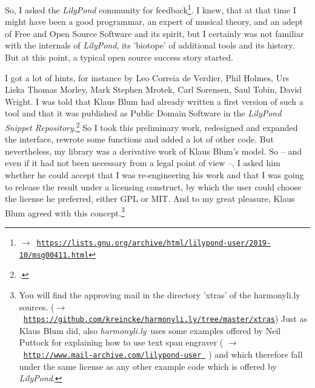 \documentclass[
  DIV=calc,
  BCOR=5mm,
  12pt,
  headings=small,
  oneside,
  abstract=true,
  toc=bib,
  xcolor=dvipsnames,
  openany,
  english]{scrartcl}
\newcommand{\acc}[0]{\textit}
\newcommand{\ra}[0]{$\rightarrow$}
\newcommand{\lnka}[1]{\href{#1}{\texttt{#1}}}
\newcommand{\hlyn}[0]{\textit{harmonyli.ly}}
\newcommand{\lily}[0]{\textit{LilyPond}}
\begin{document}
So, I asked the \acc{LilyPond} community for feedback\footnote{\ra\
\lnka{https://lists.gnu.org/archive/html/lilypond-user/2019-10/msg00411.html}}.
I knew, that at that time I might have been a good programmar, an expert of
musical theory, and an adept of Free and Open Source Software and its spirit,
but I certainly was not familiar with the internals of \acc{LilyPond}, its
'biotope' of additional tools and its history. But at this point, a typical open
source success story started.

I got a lot of hints, for instance by Leo Correia de Verdier, Phil Holmes, Urs
Liska Thomas Morley, Mark Stephen Mrotek, Carl Sorensen, Saul Tobin, David
Wright. I was told that Klaus Blum had already written a first version of such a
tool and that it was published as Public Domain Software in the \acc{LilyPond
Snippet Repository}.\footcite[cf.][\nopage wp]{Blum2019a} So I took this
preliminary work, redesigned and expanded the interface, rewrote some functions
and added a lot of other code. But nevertheless, my library was a derivative
work of Klaus Blum's model. So -- and even if it had not been necessary from a
legal point of view --, I asked him whether he could accept that I was
re-engineering his work and that I was going to release the result under a
licensing construct, by which the user could choose the license he preferred,
either GPL or MIT. And to my great pleasure, Klaus Blum agreed with this
concept.\footnote{You will find the approving mail in the directory 'xtras' of
the harmonyli.ly sources. (\ra\
\lnka{https://github.com/kreincke/harmonyli.ly/tree/master/xtras}) Just as Klaus
Blum did, also \hlyn\ uses some examples offered by Neil Puttock for explaining
how to use text span engraver ( \ra\
\lnka{http://www.mail-archive.com/lilypond-user%
} )
and which therefore fall under the same license as any other example code which
is offered by \lily. }
\end{document}
